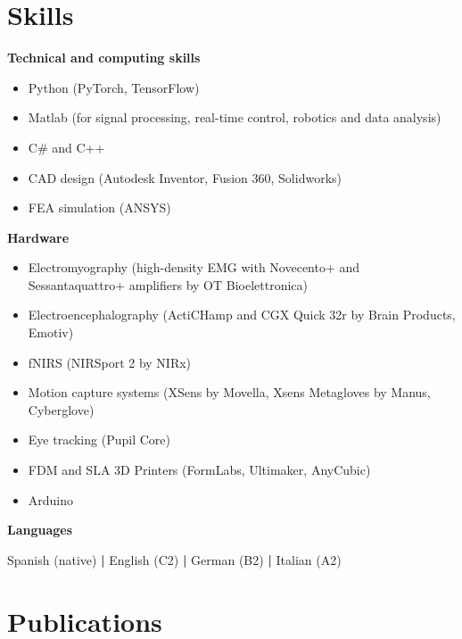 \documentclass[a4paper,10pt]{article}
\begin{document}
\section{Skills}

\textbf{Technical and computing skills}
\begin{itemize}
  \item Python (PyTorch, TensorFlow)
  \item Matlab (for signal processing, real-time control, robotics and data analysis)
  \item C\# and C++
  \item CAD design (Autodesk Inventor, Fusion 360, Solidworks)
  \item FEA simulation (ANSYS)
\end{itemize}
\newpage
\textbf{Hardware}
\begin{itemize}
  \item Electromyography (high-density EMG with Novecento+ and Sessantaquattro+ amplifiers by OT Bioelettronica)
  \item Electroencephalography (ActiCHamp and CGX Quick 32r by Brain Products, Emotiv)
  \item fNIRS (NIRSport 2 by NIRx)
  \item Motion capture systems (XSens by Movella, Xsens Metagloves by Manus, Cyberglove)
  \item Eye tracking (Pupil Core)
  \item FDM and SLA 3D Printers (FormLabs, Ultimaker, AnyCubic)
  \item Arduino
\end{itemize}

\textbf{Languages}

Spanish (native) \textbf{|} English (C2) \textbf{|} German (B2)
\textbf{|} Italian (A2)

\section{Publications}
\end{document}

